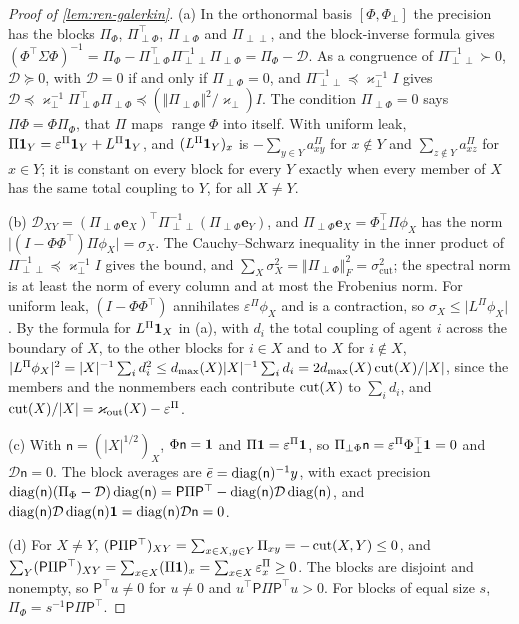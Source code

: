 \begin{proof}[Proof of \cref{lem:ren-galerkin}]
(a) In the orthonormal basis $[\Phi,\Phi_\perp]$ the precision has the blocks $\Pi_\Phi$, $\Pi_{\perp\Phi}^\top$, $\Pi_{\perp\Phi}$ and $\Pi_{\perp\perp}$, and the block-inverse formula gives $(\Phi^\top\Sigma\Phi)^{-1}=\Pi_\Phi-\Pi_{\perp\Phi}^\top\Pi_{\perp\perp}^{-1}\Pi_{\perp\Phi}=\Pi_\Phi-\mathcal D$. As a congruence of $\Pi_{\perp\perp}^{-1}\succ0$, $\mathcal D\succeq0$, with $\mathcal D=0$ if and only if $\Pi_{\perp\Phi}=0$, and $\Pi_{\perp\perp}^{-1}\preceq\varkappa_\perp^{-1}I$ gives $\mathcal D\preceq\varkappa_\perp^{-1}\Pi_{\perp\Phi}^\top\Pi_{\perp\Phi}\preceq(\Vert\Pi_{\perp\Phi}\Vert^2/\varkappa_\perp)I$. The condition $\Pi_{\perp\Phi}=0$ says $\Pi\Phi=\Phi\Pi_\Phi$, that $\Pi$ maps $\operatorname{range}\Phi$ into itself. With uniform leak, $\Pi\mathbf{1}_Y=\varepsilon^\Pi\mathbf{1}_Y+L^\Pi\mathbf{1}_Y$, and $(L^\Pi\mathbf{1}_Y)_x$ is $-\sum_{y\in Y}a^\Pi_{xy}$ for $x\notin Y$ and $\sum_{z\notin Y}a^\Pi_{xz}$ for $x\in Y$; it is constant on every block for every $Y$ exactly when every member of $X$ has the same total coupling to $Y$, for all $X\neq Y$.

(b) $\mathcal D_{XY}=(\Pi_{\perp\Phi}\mathbf e_X)^\top\Pi_{\perp\perp}^{-1}(\Pi_{\perp\Phi}\mathbf e_Y)$, and $\Pi_{\perp\Phi}\mathbf e_X=\Phi_\perp^\top\Pi\phi_X$ has the norm $\lvert(I-\Phi\Phi^\top)\Pi\phi_X\rvert=\sigma_X$. The Cauchy--Schwarz inequality in the inner product of $\Pi_{\perp\perp}^{-1}\preceq\varkappa_\perp^{-1}I$ gives the bound, and $\sum_X\sigma_X^2=\Vert\Pi_{\perp\Phi}\Vert_F^2=\sigma^2_{\mathrm{cut}}$; the spectral norm is at least the norm of every column and at most the Frobenius norm. For uniform leak, $(I-\Phi\Phi^\top)$ annihilates $\varepsilon^\Pi\phi_X$ and is a contraction, so $\sigma_X\le\lvert L^\Pi\phi_X\rvert$. By the formula for $L^\Pi\mathbf{1}_X$ in (a), with $d_i$ the total coupling of agent $i$ across the boundary of $X$, to the other blocks for $i\in X$ and to $X$ for $i\notin X$, $\lvert L^\Pi\phi_X\rvert^2=\lvert X\rvert^{-1}\sum_id_i^2\le d_{\max}(X)\lvert X\rvert^{-1}\sum_id_i=2d_{\max}(X)\operatorname{cut}(X)/\lvert X\rvert$, since the members and the nonmembers each contribute $\operatorname{cut}(X)$ to $\sum_id_i$, and $\operatorname{cut}(X)/\lvert X\rvert=\varkappa_{\mathrm{out}}(X)-\varepsilon^\Pi$.

(c) With $\mathsf n=(\lvert X\rvert^{1/2})_X$, $\Phi\mathsf n=\mathbf{1}$ and $\Pi\mathbf{1}=\varepsilon^\Pi\mathbf{1}$, so $\Pi_{\perp\Phi}\mathsf n=\varepsilon^\Pi\Phi_\perp^\top\mathbf{1}=0$ and $\mathcal D\mathsf n=0$. The block averages are $\bar e=\operatorname{diag}(\mathsf n)^{-1}y$, with exact precision $\operatorname{diag}(\mathsf n)(\Pi_\Phi-\mathcal D)\operatorname{diag}(\mathsf n)=\mathsf P\Pi\mathsf P^\top-\operatorname{diag}(\mathsf n)\mathcal D\operatorname{diag}(\mathsf n)$, and $\operatorname{diag}(\mathsf n)\mathcal D\operatorname{diag}(\mathsf n)\mathbf{1}=\operatorname{diag}(\mathsf n)\mathcal D\mathsf n=0$.

(d) For $X\neq Y$, $(\mathsf P\Pi\mathsf P^\top)_{XY}=\sum_{x\in X,y\in Y}\Pi_{xy}=-\operatorname{cut}(X,Y)\le0$, and $\sum_Y(\mathsf P\Pi\mathsf P^\top)_{XY}=\sum_{x\in X}(\Pi\mathbf{1})_x=\sum_{x\in X}\varepsilon^\Pi_x\ge0$. The blocks are disjoint and nonempty, so $\mathsf P^\top u\neq0$ for $u\neq0$ and $u^\top\mathsf P\Pi\mathsf P^\top u>0$. For blocks of equal size $s$, $\Pi_\Phi=s^{-1}\mathsf P\Pi\mathsf P^\top$.
\end{proof}

